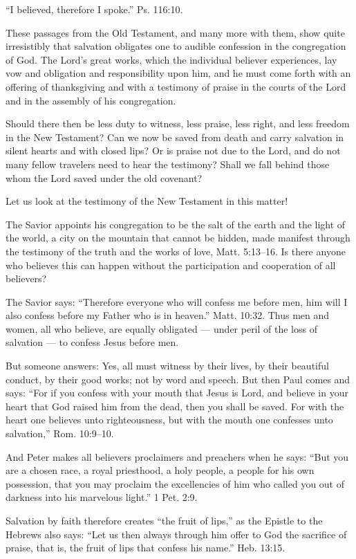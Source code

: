 “I believed, therefore I spoke.” Ps. 116:10.

These passages from the Old Testament, and many more with them, show quite irresistibly that salvation obligates one to audible confession in the congregation of God. The Lord’s great works, which the individual believer experiences, lay vow and obligation and responsibility upon him, and he must come forth with an offering of thanksgiving and with a testimony of praise in the courts of the Lord and in the assembly of his congregation.

Should there then be less duty to witness, less praise, less right, and less freedom in the New Testament? Can we now be saved from death and carry salvation in silent hearts and with closed lips? Or is praise not due to the Lord, and do not many fellow travelers need to hear the testimony? Shall we fall behind those whom the Lord saved under the old covenant?

Let us look at the testimony of the New Testament in this matter!

The Savior appoints his congregation to be the salt of the earth and the light of the world, a city on the mountain that cannot be hidden, made manifest through the testimony of the truth and the works of love, Matt. 5:13–16. Is there anyone who believes this can happen without the participation and cooperation of all believers?

The Savior says: “Therefore everyone who will confess me before men, him will I also confess before my Father who is in heaven.” Matt. 10:32. Thus men and women, all who believe, are equally obligated — under peril of the loss of salvation — to confess Jesus before men.

But someone answers: Yes, all must witness by their lives, by their beautiful conduct, by their good works; not by word and speech. But then Paul comes and says: “For if you confess with your mouth that Jesus is Lord, and believe in your heart that God raised him from the dead, then you shall be saved. For with the heart one believes unto righteousness, but with the mouth one confesses unto salvation,” Rom. 10:9–10.

And Peter makes all believers proclaimers and preachers when he says: “But you are a chosen race, a royal priesthood, a holy people, a people for his own possession, that you may proclaim the excellencies of him who called you out of darkness into his marvelous light.” 1 Pet. 2:9.

Salvation by faith therefore creates “the fruit of lips,” as the Epistle to the Hebrews also says: “Let us then always through him offer to God the sacrifice of praise, that is, the fruit of lips that confess his name.” Heb. 13:15.

